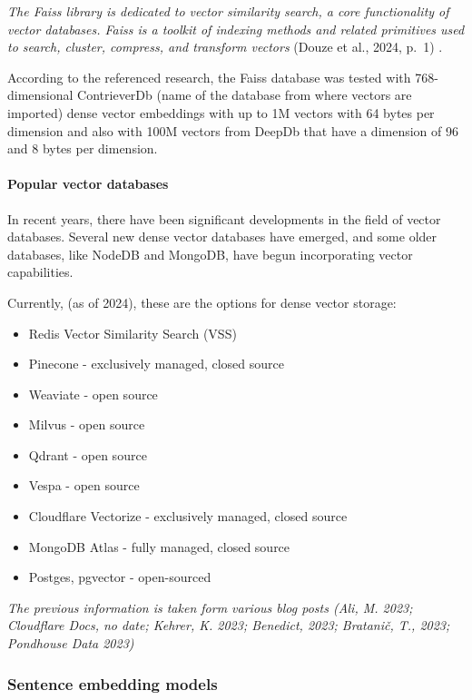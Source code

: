 \documentclass{wseas}
\begin{document}
\emph{The Faiss library is dedicated to vector similarity search, a core
functionality of vector databases. Faiss is a toolkit of indexing
methods and related primitives used to search, cluster, compress, and
transform vectors} (Douze et al., 2024, p.~1) \cite{cite2}.

According to the referenced research, the Faiss database was tested with
768-dimensional ContrieverDb (name of the database from where vectors
are imported) dense vector embeddings with up to 1M vectors with 64
bytes per dimension and also with 100M vectors from DeepDb that have a
dimension of 96 and 8 bytes per dimension.

\paragraph{Popular vector databases}

In recent years, there have been significant developments in the field
of vector databases. Several new dense vector databases have emerged,
and some older databases, like NodeDB and MongoDB, have begun
incorporating vector capabilities.

Currently, (as of 2024), these are the options for dense vector storage:

\begin{itemize}

\item
  Redis Vector Similarity Search (VSS)
\item
  Pinecone - exclusively managed, closed source
\item
  Weaviate - open source
\item
  Milvus - open source
\item
  Qdrant - open source
\item
  Vespa - open source
\item
  Cloudflare Vectorize - exclusively managed, closed source
\item
  MongoDB Atlas - fully managed, closed source
\item
  Postges, pgvector - open-sourced
\end{itemize}

\emph{The previous information is taken form various blog posts (Ali, M.
2023; Cloudflare Docs, no date; Kehrer, K. 2023; Benedict, 2023;
Bratanič, T., 2023; Pondhouse Data 2023)} \cite{cite9} \cite{cite10} \cite{cite11} 
\cite{cite12} \cite{cite13} \cite{cite14} \cite{cite15} \cite{cite16}

\subsubsection{Sentence embedding models}
\end{document}
